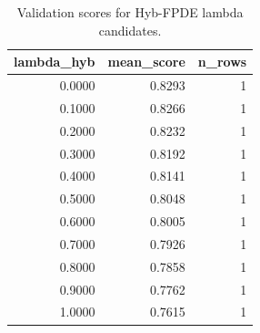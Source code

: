 \begin{table}[t]
\caption{Validation scores for Hyb-FPDE lambda candidates.}
\label{tab:lambda_distribution_computed}
\centering
\begin{tabular}{rrr}
\toprule
lambda\_hyb & mean\_score & n\_rows \\
\midrule
0.0000 & 0.8293 & 1 \\
0.1000 & 0.8266 & 1 \\
0.2000 & 0.8232 & 1 \\
0.3000 & 0.8192 & 1 \\
0.4000 & 0.8141 & 1 \\
0.5000 & 0.8048 & 1 \\
0.6000 & 0.8005 & 1 \\
0.7000 & 0.7926 & 1 \\
0.8000 & 0.7858 & 1 \\
0.9000 & 0.7762 & 1 \\
1.0000 & 0.7615 & 1 \\
\bottomrule
\end{tabular}

\end{table}
